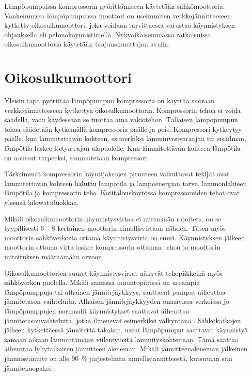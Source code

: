   Lämpöpumpuissa kompressorin pyörittämiseen käytetään sähkömoottoria. Vanhemmissa lämpöpumpuissa moottori on useimmiten verkkojännitteeseen kytketty oikosulkumoottori, joka voidaan tarvittaessa varustaa käynnistyksen ohjauksella eli pehmokäynnistimellä. Nykyaikaisemmassa ratkaisuissa oikosulkumoottoria käytetään taajuusmuuttajan avulla.

\section{Oikosulkumoottori}
  Yleisin tapa pyörittää lämpöpumpun kompressoria on käyttää suoraan verkkojännitteeseen kytkettyä oikosulkumoottoria. Kompressorin tehoa ei voida säädellä, vaan käydessään se tuottaa aina vakiotehon. Tällaisen lämpöpumpun tehoa säädetään kytkemällä kompressoria päälle ja pois. Kompressori kytkeytyy päälle, kun lämmitettävän kohteen, esimerkiksi lämminvesivaraajan tai sisäilman, lämpötila laskee tietyn rajan alapuolelle. Kun lämmitettävän kohteen lämpötila on noussut tarpeeksi, sammutetaan kompressori.

  Tärkeimmät kompressorin käyntijaksojen pituuteen vaikuttavat tekijät ovat lämmitettävän kohteen haluttu lämpötila ja lämpöenergian tarve, lämmönlähteen lämpötila ja kompressorin teho. Kotitalousköytössä kompressoreiden tehot ovat yleensä kilowattiluokkaa.

  Mikäli oikosulkumoottorin käynnistysvirtaa ei mitenkään rajoiteta, on se tyypillisesti 6 -- 8 kertainen moottorin nimellisvirtaan nähden. Täten myös moottorin sähköverkosta ottama käynnistysvirta on suuri. \parencite{pehmokaynnistinopas} Käynnistyksen jälkeen moottorin ottama virta laskee kompressorin ottaman tehon ja moottorin mitoituksen määräämään arvoon.

  Oikosulkumoottorien suuret käynnistysvirrat näkyvät tehopiikkeinä myös sähköverkon puolella. Mikäli samassa muuntopiirissä on useampia lämpöpumppuja tai alhainen jännitejäykkyys, saattavat pumput aiheuttaa jännitetason vaihteluita. Alhaisen jännitejäykkyyden omaavissa verkoissa jo lämpöpumppujen normaalit käynnistykset saattavat aiheuttaa jännitetasonvaihteluita, jotka ilmenevät esimerkiksi välkyntänä \parencite{SFSEN50160}. Sähkökatkojen jälkeen kytkettäessä jännitettä takaisin, useat lämpöpumput saattavat käynnistyä samaan aikaan lämmittämään viilentyneitä lämmityskohteitaan. Tämä saattaa aiheuttaa lyhytaikaisen jännitteen aleneman. Mikäli jännitteenaleneman jälkeinen jäännösjännite on alle \SI{90}{\percent} järjestelmän nimellisjännitteestä, kutsutaan sitä jännitekuopaksi \parencite{SFSEN50160}.

